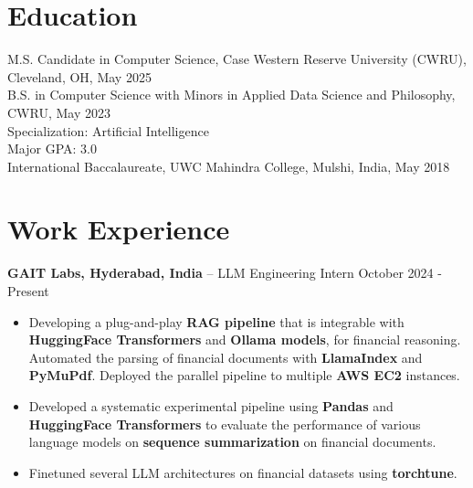 \documentclass{res}
\begin{document}
 
	\renewcommand{\namefont}{\bfseries\LARGE}
	\renewcommand{\sectionfont}{\bfseries\Large}
	
 
 
\address{ +1 2163032983 \\  rounak@case.edu}
\address{\hfill \href{https://github.com/theroshogolla}{Github: theroshogolla} \\ \hfill \href{https://www.linkedin.com/in/rounakchawla}{LinkedIn: rounakchawla}}
 
\begin{resume} 
 
\section{Education} 
M.S. Candidate in Computer Science, Case Western Reserve University (CWRU), Cleveland, OH, May 2025 \\
B.S. in Computer Science with Minors in Applied Data Science and Philosophy, CWRU, May 2023 \\
Specialization: Artificial Intelligence \\
Major GPA: 3.0 \\
International Baccalaureate, UWC Mahindra College, Mulshi, India,  May 2018

\section{Work Experience} 

{\large{\bf GAIT Labs, Hyderabad, India} – LLM Engineering Intern \hfill October 2024 - Present}
\begin{itemize} \itemsep -2pt
	\item Developing a plug-and-play \textbf{RAG pipeline} that is integrable with \textbf{HuggingFace Transformers} and \textbf{Ollama models}, for financial reasoning. Automated the parsing of financial documents with \textbf{LlamaIndex} and \textbf{PyMuPdf}. Deployed the parallel pipeline to multiple \textbf{AWS EC2} instances.
	\item Developed a systematic experimental pipeline using \textbf{Pandas} and \textbf{HuggingFace Transformers} to evaluate the performance of various language models on \textbf{sequence summarization} on financial documents.
	\item Finetuned several LLM architectures on financial datasets using \textbf{torchtune}.
\end{itemize}


\end{resume}
\end{document}
